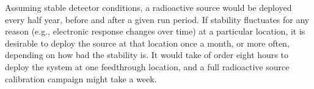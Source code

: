 Assuming stable detector conditions, a radioactive source would be deployed every half year, before and after a given run period.
If stability fluctuates for any reason (e.g., electronic response changes over time) at a particular location, it is desirable to deploy the source at that location once a month, or more often, depending on how bad the stability is. It would take of order eight hours to deploy the system at one feedthrough location, and a full radioactive source calibration campaign might take a week.

